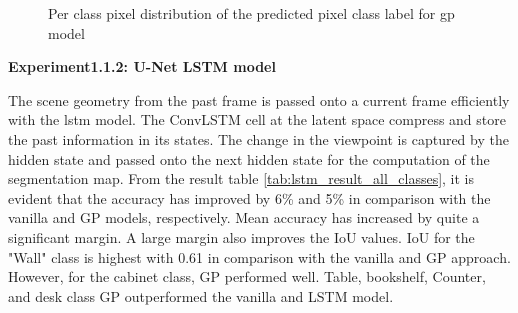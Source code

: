 	\begin{figure}%
		\centering
		\qquad
		\caption{Per class pixel distribution of the predicted pixel class label for gp model}%
		\label{fig:y_gt_and_predic_gp}%
	\end{figure}

    \newpage
	{ \bf Experiment1.1.2: U-Net LSTM model}
	
	The scene geometry from the past frame is passed onto a current frame efficiently with the lstm model. The ConvLSTM cell at the latent space compress and store the past information in its states. The change in the viewpoint is captured by the hidden state and passed onto the next hidden state for the computation of the segmentation map. From the result table \ref{tab:lstm_result_all_classes}, it is evident that the accuracy has improved by 6\% and 5\% in comparison with the vanilla and GP models, respectively. Mean accuracy has increased by quite a significant margin. A large margin also improves the IoU values. IoU for the "Wall" class is highest with 0.61 in comparison with the vanilla and GP approach. However, for the cabinet class, GP performed well. Table, bookshelf, Counter, and desk class GP outperformed the vanilla and LSTM model. 
	
